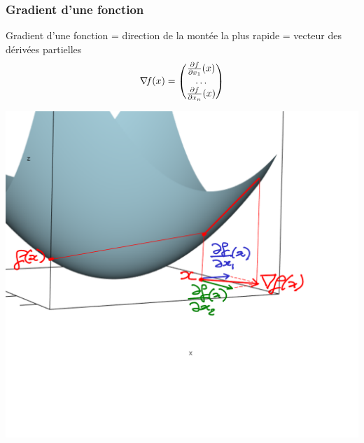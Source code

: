 \documentclass[12pt]{beamer}
\begin{document}
\begin{frame}
\frametitle{Gradient d'une fonction} 
Gradient d'une fonction = direction de la montée la plus rapide = vecteur des dérivées partielles
\begin{equation*}
\nabla\!{f}(x) = \begin{pmatrix} \frac{\partial f}{\partial x_1}(x) \\ \ldots \\ \frac{\partial f}{\partial x_n}(x) \end{pmatrix}
\end{equation*}
\begin{center}
\begin{minipage}[t]{0.7\textwidth}
\includegraphics[width=\textwidth]{gradient-crop.pdf} \\
\end{minipage}
\end{center}
\end{frame}
\end{document}
